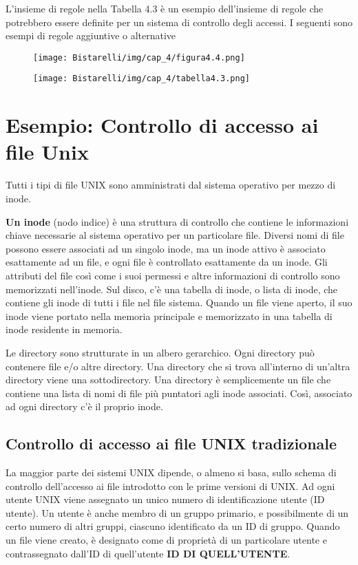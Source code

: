 \singlespacing

L'insieme di regole nella Tabella 4.3 è un esempio dell'insieme di regole che potrebbero essere definite per un sistema di controllo degli accessi. I seguenti sono esempi di regole aggiuntive o alternative

\begin{figure}[H]
	\centering
    \texttt{[image: Bistarelli/img/cap\_4/figura4.4.png]}
\end{figure}

\begin{figure}[H]
	\centering
    \texttt{[image: Bistarelli/img/cap\_4/tabella4.3.png]}
\end{figure}

\section{Esempio: Controllo di accesso ai file Unix}
Tutti i tipi di file UNIX sono amministrati dal sistema operativo per mezzo di inode.

\singlespacing

\textbf{Un inode} (nodo indice) è una struttura di controllo che contiene le informazioni chiave necessarie al sistema operativo per un particolare file. Diversi nomi di file possono essere associati ad un singolo inode, ma un inode attivo è associato esattamente ad un file, e ogni file è controllato esattamente da un inode. Gli attributi del file così come i suoi permessi e altre informazioni di controllo sono memorizzati nell'inode. Sul disco, c'è una tabella di inode, o lista di inode, che contiene gli inode di tutti i file nel file sistema. Quando un file viene aperto, il suo inode viene portato nella memoria principale e memorizzato in una tabella di inode residente in memoria.

\singlespacing

Le directory sono strutturate in un albero gerarchico. Ogni directory può contenere file e/o altre directory. Una directory che si trova all'interno di un'altra directory viene una sottodirectory. Una directory è semplicemente un file che contiene una lista di nomi di file più puntatori agli inode associati. Così, associato ad ogni directory c'è il proprio inode.

\subsection{Controllo di accesso ai file UNIX tradizionale}
La maggior parte dei sistemi UNIX dipende, o almeno si basa, sullo schema di controllo dell'accesso ai file introdotto con le prime versioni di UNIX. Ad ogni utente UNIX viene assegnato un unico numero di identificazione utente (ID utente). Un utente è anche membro di un gruppo primario, e possibilmente di un certo numero di altri gruppi, ciascuno identificato da un ID di gruppo. Quando un file viene creato, è designato come di proprietà di un particolare utente e contrassegnato dall'ID di quell'utente \textbf{ID DI QUELL'UTENTE}.

